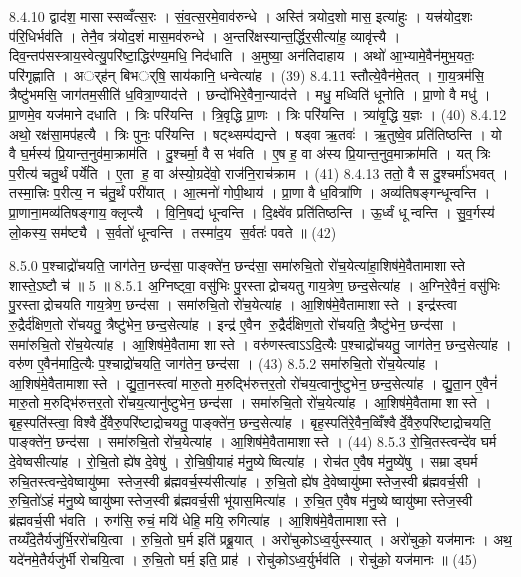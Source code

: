 8.4.10
द्वाद॑श॒ मासास्सव्वँत्स॒रः । सं॒व॒त्स॒रमे॒वाव॑रुन्धे । अस्ति॑ त्रयोद॒शो मास॒ इत्या॑हुः । यत्त्र॑योद॒शः प॑रि॒धिर्भव॑ति । तेनै॒व त्र॑योद॒शं मास॒मव॑रुन्धे । अ॒न्तरि॑क्षस्यान्त॒र्द्धिर॒सीत्या॑ह॒ व्यावृ॑त्त्यै । दिव॒न्तप॑सस्त्राय॒स्वेत्यु॒परि॑ष्टा॒द्धिर॑ण्य॒मधि॒ निद॑धाति । अ॒मुष्या॒ अन॑तिदाहाय । अथो॑ आ॒भ्यामे॒वैन॑मुभ॒यतः॒ परि॑गृह्णाति । अर््ह॑न् बिभर््षि॒ साय॑कानि॒ धन्वेत्या॑ह । (39)
8.4.11
स्तौत्ये॒वैन॑मे॒तत् । गा॒य॒त्रम॑सि॒ त्रैष्टु॑भमसि॒ जाग॑तम॒सीति॑ ध॒वित्रा॒ण्याद॑त्ते । छन्दो॑भिरे॒वैना॒न्याद॑त्ते । मधु॒ मध्विति॑ धूनोति । प्रा॒णो वै मधु॑ । प्रा॒णमे॒व यज॑माने दधाति । त्रिः परि॑यन्ति । त्रि॒वृद्धि प्रा॒णः । त्रिः परि॑यन्ति । त्र्या॑वृ॒द्धि य॒ज्ञः । (40)
8.4.12
अथो॒ रक्ष॑सा॒मप॑हत्यै । त्रिः पुनः॒ परि॑यन्ति । षट्थ्सम्प॑द्यन्ते । षड्वा ऋ॒तवः॑ । ऋ॒तुष्वे॒व प्रति॑तिष्ठन्ति । यो वै घ॒र्मस्य॑ प्रि॒यान्त॒नुव॑मा॒क्राम॑ति । दु॒श्चर्मा॒ वै स भ॑वति । ए॒ष ह॒ वा अ॑स्य प्रि॒यान्त॒नुव॒माक्रा॑मति । यत् त्रिः प॒रीत्य॑ चतु॒र्थं पर्ये॑ति । ए॒ता ह॒ वा अ॑स्यो॒ग्रदे॑वो॒ राज॑नि॒राच॑क्राम । (41)
8.4.13
ततो॒ वै स दु॒श्चर्मा॑ऽभवत् । तस्मा॒त्त्रिः प॒रीत्य॒ न च॑तु॒र्थं परी॑यात् । आ॒त्मनो॑ गोपी॒थाय॑ । प्रा॒णा वै ध॒वित्रा॑णि । अव्य॑तिषङ्गन्धून्वन्ति । प्रा॒णाना॒मव्य॑तिषङ्गाय॒ क्लृप्त्यै । वि॒नि॒षद्य॑ धून्वन्ति । दि॒क्ष्वे॑व प्रति॑तिष्ठन्ति । ऊ॒र्ध्वं धून्वन्ति । सु॒व॒र्गस्य॑ लो॒कस्य॒ सम॑ष्ट्यै । स॒र्वतो॑ धून्वन्ति । तस्मा॑द॒य स॒र्वतः॑ पवते ॥ (42)
\anuvakamend

8.5.0
प॒श्चाद्रो॑चयति॒ जाग॑तेन॒ छन्द॑सा॒ पाङ्क्ते॑न॒ छन्द॑सा॒ समा॑रुचि॒तो रो॑च॒येत्या॑हा॒शिष॑मे॒वैतामाशास्ते शास्ते॒ऽष्टौ च॑ ॥ 5 ॥
8.5.1
अ॒ग्निष्ट्वा॒ वसु॑भिः पु॒रस्ताद्रोचयतु गाय॒त्रेण॒ छन्द॒सेत्या॑ह । अ॒ग्निरे॒वैनं॒ वसु॑भिः पु॒रस्ताद्रोचयति गाय॒त्रेण॒ छन्द॑सा । समा॑रुचि॒तो रो॑च॒येत्या॑ह । आ॒शिष॑मे॒वैतामाशास्ते । इन्द्र॑स्त्वा रु॒द्रैर्द॑क्षिण॒तो रो॑चयतु॒ त्रैष्टु॑भेन॒ छन्द॒सेत्या॑ह । इन्द्र॑ ए॒वैन रु॒द्रैर्द॑क्षिण॒तो रो॑चयति॒ त्रैष्टु॑भेन॒ छन्द॑सा । समा॑रुचि॒तो रो॑च॒येत्या॑ह । आ॒शिष॑मे॒वैतामा शास्ते । वरु॑णस्त्वाऽऽदि॒त्यैः प॒श्चाद्रो॑चयतु॒ जाग॑तेन॒ छन्द॒सेत्या॑ह । वरु॑ण ए॒वैन॑मादि॒त्यैः प॒श्चाद्रो॑चयति॒ जाग॑तेन॒ छन्द॑सा । (43)
8.5.2
समा॑रुचि॒तो रो॑च॒येत्या॑ह । आ॒शिष॑मे॒वैतामाशास्ते । द्यु॒ता॒नस्त्वा॑ मारु॒तो म॒रुद्भि॑रुत्तर॒तो रो॑चय॒त्वानु॑ष्टुभेन॒ छन्द॒सेत्या॑ह । द्यु॒ता॒न ए॒वैनं॑ मारु॒तो म॒रुद्भि॑रुत्तर॒तो रो॑चय॒त्यानु॑ष्टुभेन॒ छन्द॑सा । समा॑रुचि॒तो रो॑च॒येत्या॑ह । आ॒शिष॑मे॒वैतामा शास्ते । बृह॒स्पति॑स्त्वा॒ विश्वैर्दे॒वैरु॒परि॑ष्टाद्रोचयतु॒ पाङ्क्ते॑न॒ छन्द॒सेत्या॑ह । बृह॒स्पति॑रे॒वैन॒व्विँश्वैर्दे॒वैरु॒परि॑ष्टाद्रोचयति॒ पाङ्क्ते॑न॒ छन्द॑सा । समा॑रुचि॒तो रो॑च॒येत्या॑ह । आ॒शिष॑मे॒वैतामाशास्ते । (44)
8.5.3
रो॒चि॒तस्त्वन्दे॑व घर्म दे॒वेष्वसीत्या॑ह । रो॒चि॒तो ह्ये॑ष दे॒वेषु॑ । रो॒चि॒षी॒याहं म॑नु॒ष्येष्वित्या॑ह । रोच॑त ए॒वैष म॑नु॒ष्ये॑षु । सम्राड्घर्म रुचि॒तस्त्वन्दे॒वेष्वायु॑ष्मा स्तेज॒स्वी ब्र॑ह्मवर्च॒स्य॑सीत्या॑ह । रु॒चि॒तो ह्ये॑ष दे॒वेष्वायु॑ष्मास्तेज॒स्वी ब्र॑ह्मवर्च॒सी । रु॒चि॒तो॑ऽहं म॑नु॒ष्येष्वायु॑ष्मास्तेज॒स्वी ब्र॑ह्मवर्च॒सी भू॑यास॒मित्या॑ह । रु॒चि॒त ए॒वैष म॑नु॒ष्येष्वायु॑ष्मास्तेज॒स्वी ब्र॑ह्मवर्च॒सी भ॑वति । रुग॑सि॒ रुचं॒ मयि॑ धेहि॒ मयि॒ रुगित्या॑ह । आ॒शिष॑मे॒वैतामाशास्ते । तय्यँदे॒तैर्यजु॑र्भि॒ररो॑चयि॒त्वा । रु॒चि॒तो घ॒र्म इति॑ प्रब्रू॒यात् । अरो॑चुकोऽध्व॒र्युस्स्यात् । अरो॑चुको॒ यज॑मानः । अथ॒ यदे॑नमे॒तैर्यजु॑र्भी रोचयि॒त्वा । रु॒चि॒तो घर्म॒ इति॒ प्राह॑ । रोचु॑कोऽध्व॒र्युर्भव॑ति । रोचु॑को॒ यज॑मानः ॥ (45)
\anuvakamend

